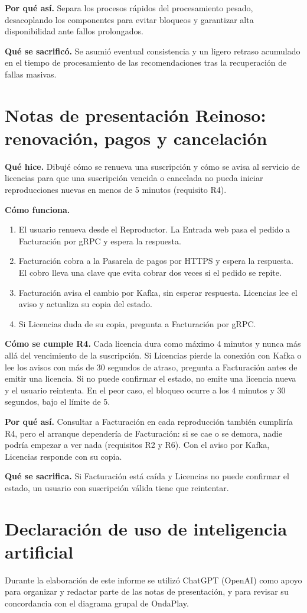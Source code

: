 \documentclass[11pt,a4paper]{article}
\begin{document}
    \textbf{Por qu\'e as\'i.} Separa los procesos r\'apidos del procesamiento pesado, desacoplando los componentes para evitar bloqueos y garantizar alta disponibilidad ante fallos prolongados.

    \textbf{Qu\'e se sacrific\'o.} Se asumi\'o eventual consistencia y un ligero retraso acumulado en el tiempo de procesamiento de las recomendaciones tras la recuperaci\'on de fallas masivas.

	\section*{Notas de presentaci\'on Reinoso: renovaci\'on, pagos y cancelaci\'on}
	\textbf{Qu\'e hice.} Dibuj\'e c\'omo se renueva una suscripci\'on y c\'omo se avisa al servicio de licencias para que una suscripci\'on vencida o cancelada no pueda iniciar reproducciones nuevas en menos de 5 minutos (requisito R4).
	
	\textbf{C\'omo funciona.}
	\begin{enumerate}[leftmargin=*,itemsep=2pt]
		\item El usuario renueva desde el Reproductor. La Entrada web pasa el pedido a Facturaci\'on por gRPC y espera la respuesta.
		\item Facturaci\'on cobra a la Pasarela de pagos por HTTPS y espera la respuesta. El cobro lleva una clave que evita cobrar dos veces si el pedido se repite.
		\item Facturaci\'on avisa el cambio por Kafka, sin esperar respuesta. Licencias lee el aviso y actualiza su copia del estado.
		\item Si Licencias duda de su copia, pregunta a Facturaci\'on por gRPC.
	\end{enumerate}
	
	\textbf{C\'omo se cumple R4.} Cada licencia dura como m\'aximo 4 minutos y nunca m\'as all\'a del vencimiento de la suscripci\'on. Si Licencias pierde la conexi\'on con Kafka o lee los avisos con m\'as de 30 segundos de atraso, pregunta a Facturaci\'on antes de emitir una licencia. Si no puede confirmar el estado, no emite una licencia nueva y el usuario reintenta. En el peor caso, el bloqueo ocurre a los 4 minutos y 30 segundos, bajo el l\'imite de 5.
	
	\textbf{Por qu\'e as\'i.} Consultar a Facturaci\'on en cada reproducci\'on tambi\'en cumplir\'ia R4, pero el arranque depender\'ia de Facturaci\'on: si se cae o se demora, nadie podr\'ia empezar a ver nada (requisitos R2 y R6). Con el aviso por Kafka, Licencias responde con su copia.
	
	\textbf{Qu\'e se sacrifica.} Si Facturaci\'on est\'a ca\'ida y Licencias no puede confirmar el estado, un usuario con suscripci\'on v\'alida tiene que reintentar.
		\section*{Declaraci\'on de uso de inteligencia artificial}
        Durante la elaboración de este informe se utilizó ChatGPT (OpenAI) como apoyo para organizar y redactar parte de las notas de presentación, y para revisar su concordancia con el diagrama grupal de OndaPlay.
\end{document}
